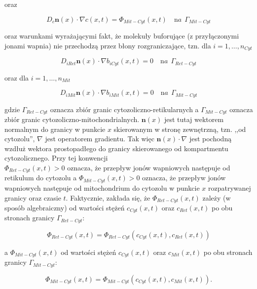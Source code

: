 \noindent oraz 

\begin{equation} \label{MCW}
D_c \boldsymbol{n}(x) \cdot \nabla c(x,t) = \Phi_{Mit-Cyt}(x,t) \quad {\mathrm na} ~~ \Gamma_{Mit-Cyt} 
\end{equation} 

\noindent oraz warunkami wyrażającymi fakt, że molekuły buforujące (z przyłączonymi jonami wapnia) nie przechodzą przez błony rozgraniczające, tzn. dla $i=1,\ldots,n_{Cyt}$

\begin{equation} \label{RBW}
D_{iRet} \boldsymbol{n}(x) \cdot \nabla b_{iCyt}(x,t) = 0 \quad {\mathrm na}~~ \Gamma_{Ret-Cyt} 
\end{equation}

\noindent oraz dla $i=1,\ldots,n_{Mit}$ 

\begin{equation} \label{MBW}
D_{iMit} \boldsymbol{n}(x) \cdot \nabla b_{iMit}(x,t) = 0 \quad {\mathrm na}~~ \Gamma_{Mit-Cyt} 
\end{equation} 

\medskip 

\noindent gdzie $\Gamma_{Ret-Cyt}$ oznacza zbiór granic cytozoliczno-retikularnych a $\Gamma_{Mit-Cyt}$ oznacza zbiór granic cytozoliczno-mitochondrialnych. $\textbf{n}(x)$ jest tutaj wektorem normalnym do granicy w punkcie $x$ skierowanym w stronę zewnętrzną, tzn. ,,od cytozolu'', $\nabla$ jest operatorem gradientu. Tak więc $\textbf{n}(x) \cdot \nabla$ jest pochodną wzdłuż wektora prostopadłego do granicy skierowanego od kompartmentu cytozolicznego. Przy tej konwencji\\ \mbox{$\Phi_{Ret-Cyt}(x,t)>0$} oznacza, że przepływ jonów wapniowych następuje od retikulum do cytozolu a \mbox{$\Phi_{Mit-Cyt}(x,t)>0$} oznacza, że przepływ jonów wapniowych następuje od mitochondrium do cytozolu w punkcie $x$ rozpatrywanej granicy oraz czasie $t$. Faktycznie, zakłada się, że $\Phi_{Ret-Cyt}(x,t)$ zależy (w sposób algebraiczny) od wartości stężeń $c_{Cyt}(x,t)$ oraz $c_{Ret}(x,t)$ po obu stronach granicy $\Gamma_{Ret-Cyt}$:

\[
\Phi_{Ret-Cyt}(x,t) = \Phi_{Ret-Cyt}\left(c_{Cyt}(x,t),c_{Ret}(x,t)\right)
\] 

\noindent a $\Phi_{Mit-Cyt}(x,t)$ od wartości stężeń $c_{Cyt}(x,t)$ oraz $c_{Mit}(x,t)$ po obu stronach granicy $\Gamma_{Mit-Cyt}$: 

\[
\Phi_{Mit-Cyt}(x,t) = \Phi_{Mit-Cyt}\left(c_{Cyt}(x,t),c_{Mit}(x,t)\right). 
\] 

